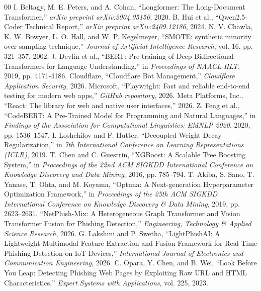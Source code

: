 \documentclass[conference]{IEEEtran}
\begin{document}
\begin{thebibliography}{00}
 I. Beltagy, M. E. Peters, and A. Cohan, ``Longformer: The Long-Document Transformer,'' \textit{arXiv preprint arXiv:2004.05150}, 2020.
 B. Hui et al., ``Qwen2.5-Coder Technical Report,'' \textit{arXiv preprint arXiv:2409.12186}, 2024.
 N. V. Chawla, K. W. Bowyer, L. O. Hall, and W. P. Kegelmeyer, ``SMOTE: synthetic minority over-sampling technique,'' \textit{Journal of Artificial Intelligence Research}, vol. 16, pp. 321–357, 2002.
 J. Devlin et al., ``BERT: Pre-training of Deep Bidirectional Transformers for Language Understanding,'' in \textit{Proceedings of NAACL-HLT}, 2019, pp. 4171-4186.
 Cloudflare, ``Cloudflare Bot Management,'' \textit{Cloudflare Application Security}, 2026.
 Microsoft, ``Playwright: Fast and reliable end-to-end testing for modern web apps,'' \textit{GitHub repository}, 2026.
 Meta Platforms, Inc., ``React: The library for web and native user interfaces,'' 2026.
 Z. Feng et al., ``CodeBERT: A Pre-Trained Model for Programming and Natural Languages,'' in \textit{Findings of the Association for Computational Linguistics: EMNLP 2020}, 2020, pp. 1536–1547.
 I. Loshchilov and F. Hutter, ``Decoupled Weight Decay Regularization,'' in \textit{7th International Conference on Learning Representations (ICLR)}, 2019.
 T. Chen and C. Guestrin, ``XGBoost: A Scalable Tree Boosting System,'' in \textit{Proceedings of the 22nd ACM SIGKDD International Conference on Knowledge Discovery and Data Mining}, 2016, pp. 785–794.
 T. Akiba, S. Sano, T. Yanase, T. Ohta, and M. Koyama, ``Optuna: A Next-generation Hyperparameter Optimization Framework,'' in \textit{Proceedings of the 25th ACM SIGKDD International Conference on Knowledge Discovery \& Data Mining}, 2019, pp. 2623–2631.
 ``NetPhish-Mix: A Heterogeneous Graph Transformer and Vision Transformer Fusion for Phishing Detection,'' \textit{Engineering, Technology \& Applied Science Research}, 2026.
 G. Lakshmi and P. Swetha, ``LightPhishAI: A Lightweight Multimodal Feature Extraction and Fusion Framework for Real-Time Phishing Detection on IoT Devices,'' \textit{International Journal of Electronics and Communication Engineering}, 2026.
 C. Opara, Y. Chen, and B. Wei, ``Look Before You Leap: Detecting Phishing Web Pages by Exploiting Raw URL and HTML Characteristics,'' \textit{Expert Systems with Applications}, vol. 225, 2023.
\end{thebibliography}
\end{document}
